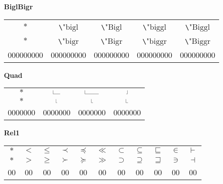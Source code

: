 \documentclass[12pt]{report}
\newlength{\mine}
\newlength{\niz}
\def\pmb{}
\newcommand{\demowidth}[1]{\rule{0.3pt}{1.3ex}\rule{#1}{0.3pt}}
\newcommand{\negdemowidth}[1]{\rule{#1}{0.3pt}\rule{0.3pt}{1.3ex}}
\begin{document}
\textbf{BiglBigr}
\par\nobreak\vspace{2mm}
\begin{tabular}{|c|cccc|}
  \hline
   $\pmb *         $&
   \small\verb"\"$\mathrm{bigl}$&\small\verb"\"$\mathrm{Bigl}$&\small\verb"\"$\mathrm{biggl}$&\small\verb"\"$\mathrm{Biggl}$\\[\mine]
   $\pmb *         $&
   \small\verb"\"$\mathrm{bigr}$&\small\verb"\"$\mathrm{Bigr}$&\small\verb"\"$\mathrm{biggr}$&\small\verb"\"$\mathrm{Biggr}$\\[\niz]
  \hline\hline
  000000000&000000000&000000000&000000000&000000000\\
  \hline
\end{tabular}
\goodbreak\par\vspace{3mm}

\textbf{Quad}
\par\nobreak\vspace{2mm}
\begin{tabular}{|c|ccc|}
  \hline
   $\pmb *         $&
   $\demowidth{1em}$&
   $\demowidth{2em}$&
   $\negdemowidth{0.166em}$\\[\mine]
   $\pmb *         $&
   $\demowidth{0.166em}$&
   $\demowidth{0.222em}$&
   $\demowidth{0.277em}$\\[\niz]
  \hline\hline
  0000000&0000000&0000000&0000000\\
  \hline
\end{tabular}
\goodbreak\par\vspace{3mm}

\newpage

\textbf{Rel1}
\par\nobreak\vspace{2mm}
\begin{tabular}{|c|cccccccccc|}
  \hline
   $\pmb *         $&
   $\pmb <         $&
   $\pmb\leq       $&
   $\pmb\prec      $&
   $\pmb\preceq    $&
   $\pmb\ll        $&
   $\pmb\subset    $&
   $\pmb\subseteq  $&
   $\pmb\sqsubseteq$&
   $\pmb\in        $&
   $\pmb\vdash     $\\[\mine]
   $\pmb *         $&
   $\pmb >         $&
   $\pmb\geq       $&
   $\pmb\succ      $&
   $\pmb\succeq    $&
   $\pmb\gg        $&
   $\pmb\supset    $&
   $\pmb\supseteq  $&
   $\pmb\sqsupseteq$&
   $\pmb\ni        $&
   $\pmb\dashv     $\\[\niz]
  \hline\hline
  00&00&00&00&00&00&00&00&00&00&00\\
  \hline
\end{tabular}
\goodbreak\par\vspace{3mm}
\end{document}
